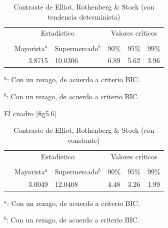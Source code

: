 \documentclass[12pt, twoside]{book}\usepackage[]{graphicx}\usepackage[]{color}
\numberwithin{equation}{section}
\numberwithin{theorem}{section}
\numberwithin{teorema}{section}
\numberwithin{defi}{section}
\numberwithin{prop}{section}
\numberwithin{defi}{section}
\theoremstyle{plain}
\begin{document}
\begin{table}[!htpb]
\centering
\begin{threeparttable}
\caption{Contraste de Elliot, Rothenberg \& Stock (con tendencia determinista)\label{fig5.5}}
\begin{tabular}{@{}lrllll@{}}
\toprule
\multicolumn{1}{l}{} & \multicolumn{2}{c}{Estadístico} &
\multicolumn{3}{c}{Valores críticos} \\
\cmidrule(l){2-3} \cmidrule(l){4-6} \\
\multicolumn{1}{l}{} & \multicolumn{1}{c}{Mayorista$^{a}$} &
 \multicolumn{1}{c}{Supermercado$^{b}$} &
\multicolumn{1}{l}{90\%}&
\multicolumn{1}{l}{95\%}&
\multicolumn{1}{l}{99\%}
\\
\midrule
  & 3.8715 &  10.0306 & 6.89 & 5.62 & 3.96 \\
\bottomrule
\end{tabular}
\label{tab-8}
\begin{tablenotes}
\small 
\item $^{a}$: Con un rezago, de acuerdo a criterio BIC. 
\item $^{b}$: Con un rezago, de acuerdo a criterio BIC. 
\end{tablenotes}
\end{threeparttable}
\end{table}

El cuadro \ref{fig5.6}

\begin{table}[!htpb]
\centering
\begin{threeparttable}
\caption{Contraste de Elliot, Rothenberg \& Stock (con constante)\label{fig5.6}}
\begin{tabular}{@{}lrllll@{}}
\toprule
\multicolumn{1}{l}{} & \multicolumn{2}{c}{Estadístico} &
\multicolumn{3}{c}{Valores críticos} \\
\cmidrule(l){2-3} \cmidrule(l){4-6} \\
\multicolumn{1}{l}{} & \multicolumn{1}{c}{Mayorista$^{a}$} &
 \multicolumn{1}{c}{Supermercado$^{b}$} &
\multicolumn{1}{l}{90\%}&
\multicolumn{1}{l}{95\%}&
\multicolumn{1}{l}{99\%}
\\
\midrule
  & 3.0049 &  12.0408 & 4.48 & 3.26 & 1.99 \\
\bottomrule
\end{tabular}
\label{tab-9}
\begin{tablenotes}
\small 
\item $^{a}$: Con un rezago, de acuerdo a criterio BIC. 
\item $^{b}$: Con un rezago, de acuerdo a criterio BIC. 
\end{tablenotes}
\end{threeparttable}
\end{table}
\end{document}
